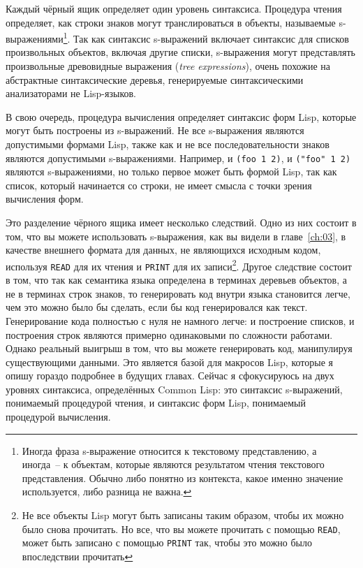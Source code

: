 Каждый чёрный ящик определяет один уровень синтаксиса. Процедура чтения определяет, как
строки знаков могут транслироваться в объекты, называемые s-выражениями\footnote{Иногда
  фраза s-выражение относится к текстовому представлению, а иногда~-- к объектам, которые
  являются результатом чтения текстового представления. Обычно либо понятно из контекста,
  какое именно значение используется, либо разница не важна.}. Так как синтаксис
s-выражений включает синтаксис для списков произвольных объектов, включая другие списки,
s-выражения могут представлять произвольные древовидные выражения (\textit{tree
  expressions}), очень похожие на абстрактные синтаксические деревья, генерируемые
синтаксическими анализаторами не Lisp-языков.

В свою очередь, процедура вычисления определяет синтаксис форм Lisp, которые могут быть
построены из s-выражений. Не все s-выражения являются допустимыми формами Lisp, также как и
не все последовательности знаков являются допустимыми s-выражениями. Например, и
\lstinline{(foo 1 2)}, и \lstinline{("foo" 1 2)} являются s-выражениями, но только первое может быть
формой Lisp, так как список, который начинается со строки, не имеет смысла с точки зрения
вычисления форм.

Это разделение чёрного ящика имеет несколько следствий. Одно из них состоит в том, что вы
можете использовать s-выражения, как вы видели в главе~\ref{ch:03}, в качестве внешнего формата для
данных, не являющихся исходным кодом, используя \lstinline{READ} для их чтения и
\lstinline{PRINT} для их записи\footnote{Не все объекты Lisp могут быть записаны таким
  образом, чтобы их можно было снова прочитать. Но все, что вы можете прочитать с помощью
  \lstinline{READ}, может быть записано с помощью \lstinline{PRINT} так, чтобы это можно было
  впоследствии прочитать}. Другое следствие состоит в том, что так как семантика языка
определена в терминах деревьев объектов, а не в терминах строк знаков, то генерировать код
внутри языка становится легче, чем это можно было бы сделать, если бы код генерировался
как текст. Генерирование кода полностью с нуля не намного легче: и построение списков, и
построения строк являются примерно одинаковыми по сложности работами. Однако реальный
выигрыш в том, что вы можете генерировать код, манипулируя существующими данными. Это
является базой для макросов Lisp, которые я опишу гораздо подробнее в будущих
главах. Сейчас я сфокусируюсь на двух уровнях синтаксиса, определённых Common Lisp: это
синтаксис s-выражений, понимаемый процедурой чтения, и синтаксис форм Lisp, понимаемый
процедурой вычисления.

